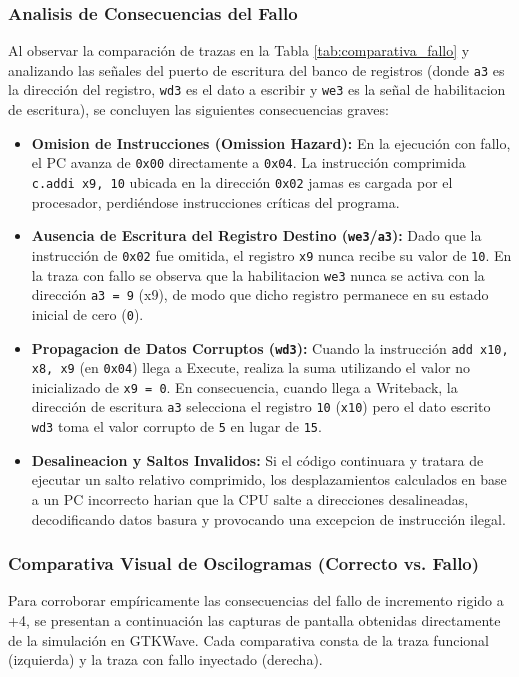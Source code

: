\documentclass[12pt, a4paper]{article}
\begin{document}
\subsubsection{Analisis de Consecuencias del Fallo}
Al observar la comparación de trazas en la Tabla \ref{tab:comparativa_fallo} y analizando las señales del puerto de escritura del banco de registros (donde \texttt{a3} es la dirección del registro, \texttt{wd3} es el dato a escribir y \texttt{we3} es la señal de habilitacion de escritura), se concluyen las siguientes consecuencias graves:
\begin{itemize}
    \item \textbf{Omision de Instrucciones (Omission Hazard):} En la ejecución con fallo, el PC avanza de \texttt{0x00} directamente a \texttt{0x04}. La instrucción comprimida \texttt{c.addi x9, 10} ubicada en la dirección \texttt{0x02} jamas es cargada por el procesador, perdiéndose instrucciones críticas del programa.
    \item \textbf{Ausencia de Escritura del Registro Destino (\texttt{we3}/\texttt{a3}):} Dado que la instrucción de \texttt{0x02} fue omitida, el registro \texttt{x9} nunca recibe su valor de \texttt{10}. En la traza con fallo se observa que la habilitacion \texttt{we3} nunca se activa con la dirección \texttt{a3 = 9} (x9), de modo que dicho registro permanece en su estado inicial de cero (\texttt{0}).
    \item \textbf{Propagacion de Datos Corruptos (\texttt{wd3}):} Cuando la instrucción \texttt{add x10, x8, x9} (en \texttt{0x04}) llega a Execute, realiza la suma utilizando el valor no inicializado de \texttt{x9 = 0}. En consecuencia, cuando llega a Writeback, la dirección de escritura \texttt{a3} selecciona el registro \texttt{10} (\texttt{x10}) pero el dato escrito \texttt{wd3} toma el valor corrupto de \texttt{5} en lugar de \texttt{15}.
    \item \textbf{Desalineacion y Saltos Invalidos:} Si el código continuara y tratara de ejecutar un salto relativo comprimido, los desplazamientos calculados en base a un PC incorrecto harian que la CPU salte a direcciones desalineadas, decodificando datos basura y provocando una excepcion de instrucción ilegal.
\end{itemize}

\subsubsection{Comparativa Visual de Oscilogramas (Correcto vs. Fallo)}
Para corroborar empíricamente las consecuencias del fallo de incremento rigido a +4, se presentan a continuación las capturas de pantalla obtenidas directamente de la simulación en GTKWave. Cada comparativa consta de la traza funcional (izquierda) y la traza con fallo inyectado (derecha).
\end{document}
